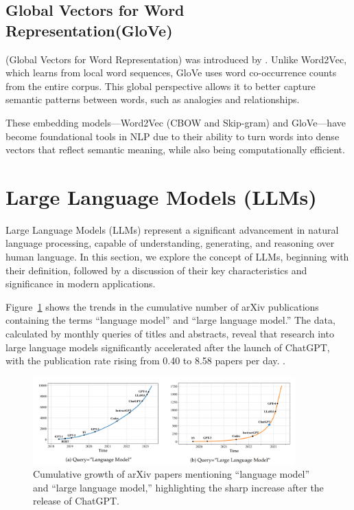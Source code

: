 \subsection{Global Vectors for Word Representation(GloVe)} (Global Vectors for Word Representation) was introduced by \citep{pennington2014glove}. Unlike Word2Vec, which learns from local word sequences, GloVe uses word co-occurrence counts from the entire corpus. This global perspective allows it to better capture semantic patterns between words, such as analogies and relationships.

These embedding models—Word2Vec (CBOW and Skip-gram) and GloVe—have become foundational tools in NLP due to their ability to turn words into dense vectors that reflect semantic meaning, while also being computationally efficient.

\section{Large Language Models (LLMs)}

Large Language Models (LLMs) represent a significant advancement in natural language processing, capable of understanding, generating, and reasoning over human language. In this section, we explore the concept of LLMs, beginning with their definition, followed by a discussion of their key characteristics and significance in modern applications.


Figure~\ref{fig:llm_growth} shows the trends in the cumulative number of arXiv publications containing the terms ``language model'' and ``large language model.'' The data, calculated by monthly queries of titles and abstracts, reveal that research into large language models significantly accelerated after the launch of ChatGPT, with the publication rate rising from 0.40 to 8.58 papers per day.
.
\begin{figure}[H]
	\centering
	\includegraphics[width=0.9\textwidth]{Figures/arixpapers.png}
	\caption{Cumulative growth of arXiv papers mentioning ``language model'' and ``large language model,'' highlighting the sharp increase after the release of ChatGPT.}
	\label{fig:llm_growth}
\end{figure}


